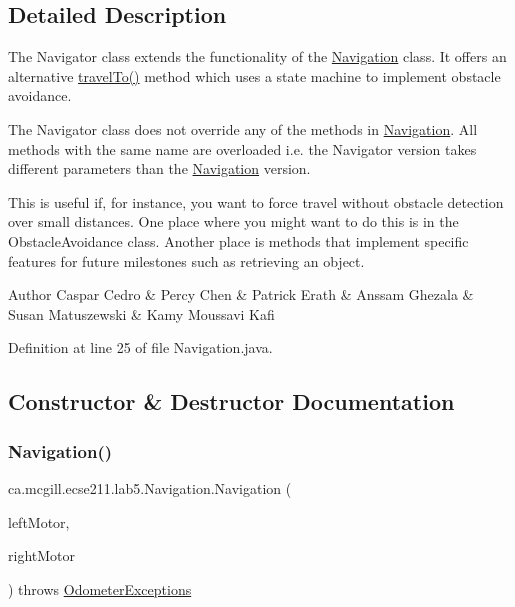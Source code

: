 \subsection{Detailed Description}
The Navigator class extends the functionality of the \hyperlink{classca_1_1mcgill_1_1ecse211_1_1lab5_1_1_navigation}{Navigation} class. It offers an alternative \hyperlink{classca_1_1mcgill_1_1ecse211_1_1lab5_1_1_navigation_a318969f4776d0bf4a8721be3d2444a5c}{travel\+To()} method which uses a state machine to implement obstacle avoidance.

The Navigator class does not override any of the methods in \hyperlink{classca_1_1mcgill_1_1ecse211_1_1lab5_1_1_navigation}{Navigation}. All methods with the same name are overloaded i.\+e. the Navigator version takes different parameters than the \hyperlink{classca_1_1mcgill_1_1ecse211_1_1lab5_1_1_navigation}{Navigation} version.

This is useful if, for instance, you want to force travel without obstacle detection over small distances. One place where you might want to do this is in the Obstacle\+Avoidance class. Another place is methods that implement specific features for future milestones such as retrieving an object.

\begin{DoxyAuthor}{Author}
Caspar Cedro \& Percy Chen \& Patrick Erath \& Anssam Ghezala \& Susan Matuszewski \& Kamy Moussavi Kafi 
\end{DoxyAuthor}


Definition at line 25 of file Navigation.\+java.



\subsection{Constructor \& Destructor Documentation}
\mbox{\label{classca_1_1mcgill_1_1ecse211_1_1lab5_1_1_navigation_a93b746f61226c3b14532c43d0c2f61dd}} 
\subsubsection{\texorpdfstring{Navigation()}{Navigation()}}
{\footnotesize\ttfamily ca.\+mcgill.\+ecse211.\+lab5.\+Navigation.\+Navigation (\begin{DoxyParamCaption}\item[{E\+V3\+Large\+Regulated\+Motor}]{left\+Motor,  }\item[{E\+V3\+Large\+Regulated\+Motor}]{right\+Motor }\end{DoxyParamCaption}) throws \hyperlink{classca_1_1mcgill_1_1ecse211_1_1odometer_1_1_odometer_exceptions}{Odometer\+Exceptions}}

